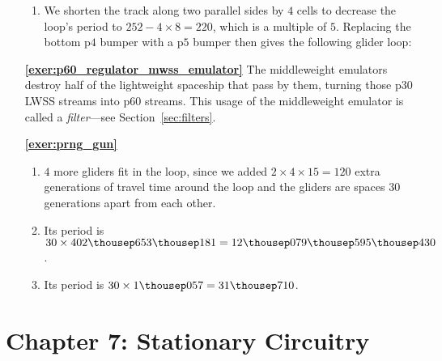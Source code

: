 \begin{multicols}{2}
\begin{itemize}[leftmargin=0em]
\begin{enumerate}[leftmargin=1.5em,label=\bf\color{ocre}(\alph*)]
			\item We shorten the track along two parallel sides by $4$ cells to decrease the loop's period to $252 - 4 \times 8 = 220$, which is a multiple of $5$. Replacing the bottom p$4$ bumper with a p$5$ bumper then gives the following glider loop:
			
			\noindent\begin{center}
			\end{center}
		\end{enumerate}
	
	
		\item[\bf\color{ocre}\sffamily\ref{exer:p60_regulator_mwss_emulator}] The middleweight emulators destroy half of the lightweight spaceship that pass by them, turning those p$30$ LWSS streams into p$60$ streams. This usage of the middleweight emulator is called a \emph{filter}---see Section~\ref{sec:filters}.\\
		
		
		\item[\bf\color{ocre}\sffamily\ref{exer:prng_gun}] \begin{enumerate}[leftmargin=1.5em,label=\bf\color{ocre}(\alph*)]
			\item $4$ more gliders fit in the loop, since we added $2 \times 4 \times 15 = 120$ extra generations of travel time around the loop and the gliders are spaces $30$ generations apart from each other.
			
			\item Its period is $30 \times 402{\thousep}653{\thousep}181 = 12{\thousep}079{\thousep}595{\thousep}430$.
			
			\item Its period is $30 \times 1{\thousep}057 = 31{\thousep}710$.
		\end{enumerate}
	\end{itemize}
\end{multicols}



\hypertarget{solutions_stable_circuitry}{}\label{solutions_stable_circuitry}
\section*{Chapter 7: Stationary Circuitry}
\renewcommand{\chapterfolder}{stationary_circuitry/}

